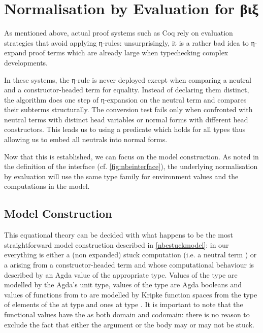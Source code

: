 
\section{Normalisation by Evaluation for βιξ}

As mentioned above, actual proof systems such as Coq rely on evaluation
strategies that avoid applying η-rules: unsurprisingly, it is a rather
bad idea to η-expand proof terms which are already large when typechecking
complex developments.

In these systems, the η-rule is never deployed except when comparing a
neutral and a constructor-headed term for equality. Instead of declaring
them distinct, the algorithm does one step of η-expansion on the
neutral term and compares their subterms structurally. The conversion test
fails only when confronted with neutral terms with distinct head
variables or normal forms with different head constructors.
This leads us to using a predicate  which holds for all types
thus allowing us to embed all neutrals into normal forms.

Now that this is established, we can focus on the model construction. As
noted in the definition of the  interface (cf. \cref{fig:nbeinterface}),
the  underlying normalisation by evaluation will use the
same type family for environment values and the computations in the model.

\subsection{Model Construction}

This equational theory can be decided with what happens to be the most
straightforward model construction described in \cref{nbestuckmodel}:
in our  everything is either a (non expanded) stuck computation
(i.e. a neutral term ) or a  arising from a constructor-headed
term and whose computational behaviour is described by an Agda value of the
appropriate type.
%
Values of the  type are modelled by the Agda's unit type, values
of the  type are Agda booleans and values of functions from 
to  are modelled by Kripke function spaces from the type of elements of
the  at type  and ones at type .
%
It is important to note that the functional values have the  as both
domain and codomain: there is no reason to exclude the fact that either the
argument or the body may or may not be stuck.

